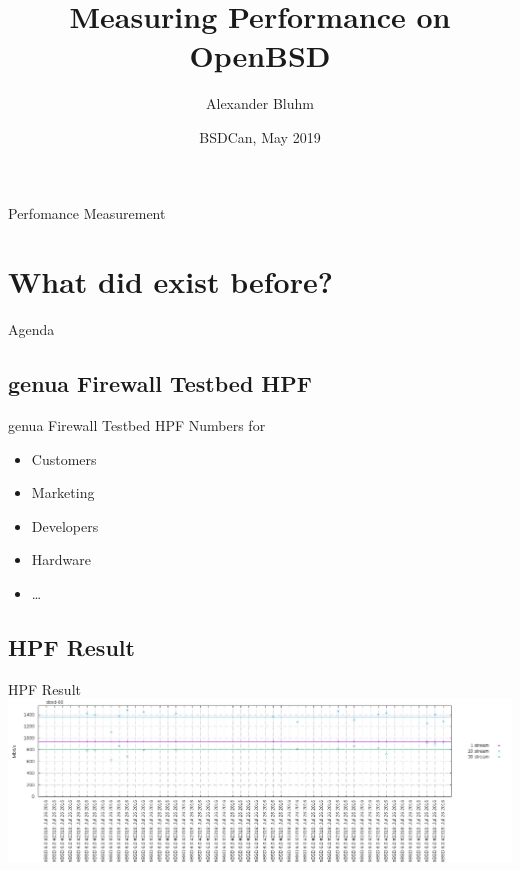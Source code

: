 \documentclass[14pt,aspectratio=169]{beamer}
\author{Alexander Bluhm}
\title{Measuring Performance on OpenBSD}
\institute{bluhm@openbsd.org}
\date{BSDCan, May 2019}
\begin{document}
\begin{frame}
\titlepage
\end{frame}

\begin{frame}{Perfomance Measurement}
\setcounter{tocdepth}{1}
\tableofcontents
\end{frame}

\section{What did exist before?}

\begin{frame}{Agenda}
\setcounter{tocdepth}{1}
\tableofcontents[currentsection]
\end{frame}

\subsection{genua Firewall Testbed HPF}
\begin{frame}{genua Firewall Testbed HPF}
Numbers for
\begin{itemize}
    \item Customers
    \item Marketing
    \item Developers
    \item Hardware
    \item \dots
\end{itemize}
\end{frame}

\subsection{HPF Result}
\begin{frame}{HPF Result}
    \includegraphics[width=\textwidth]{images/gs700r7_obsd_proxy_tcp.png}
\end{frame}
\end{document}
